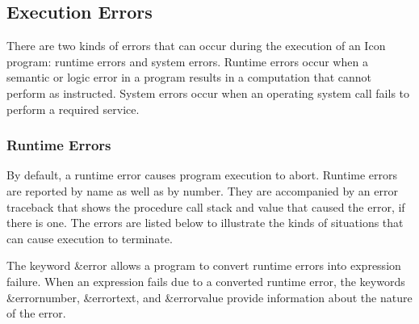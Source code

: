 \subsection{Execution Errors}

There are two kinds of errors that can occur during the execution of an
Icon program: runtime errors and system errors. Runtime errors occur
when a semantic or logic error in a program results in a computation
that cannot perform as instructed. System errors occur when an
operating system call fails to perform a
required service.

\subsubsection{Runtime Errors}

By default, a runtime error causes program
execution to abort. Runtime errors are reported by name as well as by
number. They are accompanied by an error traceback that shows the
procedure call stack and value that caused the error, if there is one.
The errors are listed below to illustrate the kinds of situations that
can cause execution to terminate.

The keyword \&error allows a program to convert runtime errors into
expression failure. When an expression fails due to a converted runtime
error, the keywords \&errornumber, \&errortext, and \&errorvalue
provide information about the nature of the error.

